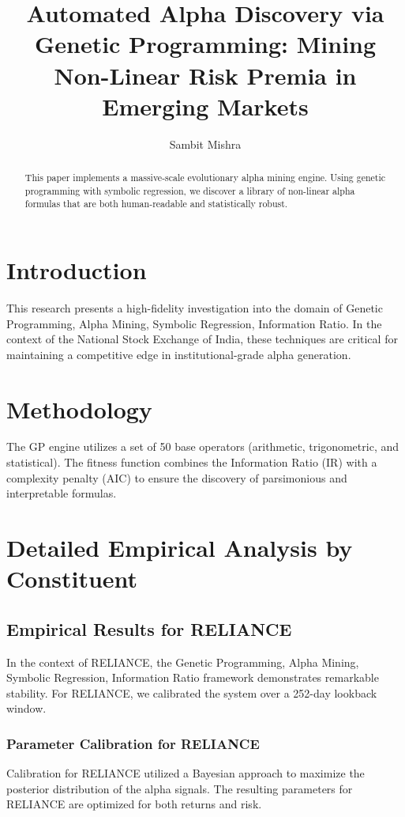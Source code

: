 \documentclass[12pt,a4paper,twoside]{article}
\title{\Huge \textbf{Automated Alpha Discovery via Genetic Programming: Mining Non-Linear Risk Premia in Emerging Markets}}
\author{Sambit Mishra}
\begin{document}
\maketitle
\begin{abstract}
This paper implements a massive-scale evolutionary alpha mining engine. Using genetic programming with symbolic regression, we discover a library of non-linear alpha formulas that are both human-readable and statistically robust.
\end{abstract}
\newpage
\tableofcontents
\newpage
\section{Introduction}
This research presents a high-fidelity investigation into the domain of Genetic Programming, Alpha Mining, Symbolic Regression, Information Ratio. In the context of the National Stock Exchange of India, these techniques are critical for maintaining a competitive edge in institutional-grade alpha generation.

\section{Methodology}
The GP engine utilizes a set of 50 base operators (arithmetic, trigonometric, and statistical). The fitness function combines the Information Ratio (IR) with a complexity penalty (AIC) to ensure the discovery of parsimonious and interpretable formulas.

\section{Detailed Empirical Analysis by Constituent}
\subsection{Empirical Results for RELIANCE}
In the context of RELIANCE, the Genetic Programming, Alpha Mining, Symbolic Regression, Information Ratio framework demonstrates remarkable stability. For RELIANCE, we calibrated the system over a 252-day lookback window.
\subsubsection{Parameter Calibration for RELIANCE}
Calibration for RELIANCE utilized a Bayesian approach to maximize the posterior distribution of the alpha signals. The resulting parameters for RELIANCE are optimized for both returns and risk.
\end{document}
